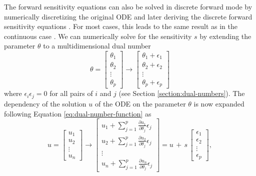 The forward sensitivity equations can also be solved in discrete forward mode by numerically discretizing the original ODE and later deriving the discrete forward sensitivity equations \cite{ma2021comparison}. 
For most cases, this leads to the same result as in the continuous case \cite{FATODE2014}.
We can numerically solve for the sensitivity $s$ by extending the parameter $\theta$ to a multidimensional dual number %
\begin{equation}
    \theta =
    \begin{bmatrix}
    \theta_1 \\
    \theta_2 \\
    \vdots \\
    \theta_p
    \end{bmatrix}
    \longrightarrow
    \begin{bmatrix}
    \theta_1 + \epsilon_1 \\
    \theta_2 + \epsilon_2 \\
    \vdots \\
    \theta_p + \epsilon_p
    \end{bmatrix}
\end{equation}
where $\epsilon_i \epsilon_j = 0$ for all pairs of $i$ and $j$ (see Section \ref{section:dual-numbers}). 
The dependency of the solution $u$ of the ODE on the parameter $\theta$ is now expanded following Equation \eqref{eq:dual-number-function} as 
\begin{equation}
    u =
    \begin{bmatrix}
    u_1 \\
    u_2 \\
    \vdots \\
    u_n
    \end{bmatrix}
    \longrightarrow
    \begin{bmatrix}
    u_1 + \sum_{j=1}^p \frac{\partial u_1}{\partial \theta_j} \epsilon_j \\
    u_2 + \sum_{j=1}^p \frac{\partial u_2}{\partial \theta_j} \epsilon_j \\
    \vdots \\
    u_n + \sum_{j=1}^p \frac{\partial u_n}{\partial \theta_j} \epsilon_j
    \end{bmatrix}
    = 
    u \, + \, s \, 
    \begin{bmatrix}
    \epsilon_1 \\
    \epsilon_2 \\
    \vdots \\
    \epsilon_p
    \end{bmatrix},
\end{equation}
